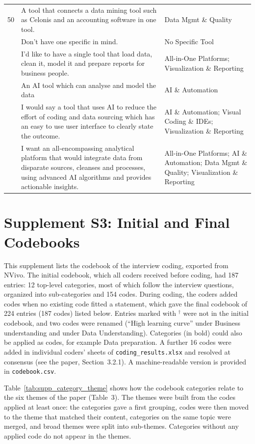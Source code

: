 \documentclass[11pt]{article}
\begin{document}
\begin{longtable}{l p{8.5cm} p{4.5cm}}
50 & A tool that connects  a data mining tool such as Celonis and an accounting software in one tool. & Data Mgmt \& Quality \\
\addlinespace
51 & Don't have one specific in mind. & No Specific Tool \\
\addlinespace
52 & I'd like to have a single tool that load data, clean it, model it and prepare reports for business people. & All-in-One Platforms; Visualization \& Reporting \\
\addlinespace
53 & An AI tool which can analyse and model the data & AI \& Automation \\
\addlinespace
54 & I would say a tool that uses AI to reduce the effort of coding and data sourcing which has an easy to use user interface to clearly state the outcome. & AI \& Automation; Visual Coding \& IDEs; Visualization \& Reporting \\
\addlinespace
55 & I want an all-encompassing analytical platform that would integrate data from disparate sources, cleanses and processes, using advanced AI algorithms and provides actionable insights. & All-in-One Platforms; AI \& Automation; Data Mgmt \& Quality; Visualization \& Reporting \\
%
\end{longtable}


\clearpage
\section*{Supplement S3: Initial and Final Codebooks}
\label{sec:supp_codebook}

This supplement lists the codebook of the interview coding, exported from NVivo.
The initial codebook, which all coders received before coding, had 187 entries: 12 top-level categories, most of which follow the interview questions, organized into sub-categories and 154 codes.
During coding, the coders added codes when no existing code fitted a statement, which gave the final codebook of 224 entries (187 codes) listed below.
Entries marked with $^\dagger$ were not in the initial codebook, and two codes were renamed (``High learning curve'' under Business understanding and under Data Understanding).
Categories (in bold) could also be applied as codes, for example Data preparation.
A further 16 codes were added in individual coders' sheets of \texttt{coding\_results.xlsx} and resolved at consensus (see the paper, Section~3.2.1).
A machine-readable version is provided in \texttt{codebook.csv}.

Table~\ref{tab:supp_category_theme} shows how the codebook categories relate to the six themes of the paper (Table~3).
The themes were built from the codes applied at least once: the categories gave a first grouping, codes were then moved to the theme that matched their content, categories on the same topic were merged, and broad themes were split into sub-themes.
Categories without any applied code do not appear in the themes.
\end{document}
